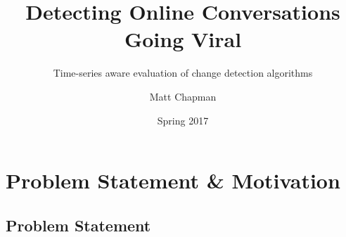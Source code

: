 \documentclass{uvamscse}	%
\title{Detecting Online Conversations Going Viral}
\subtitle{Time-series aware evaluation of change detection algorithms}
\date{Spring 2017}
\author{Matt Chapman}
\begin{document}
\nocite{*}
\maketitle


\chapter{Problem Statement \& Motivation}

\section{Problem Statement}
\label{Problem Statement}

%
%
%
%
%
%
\end{document}
